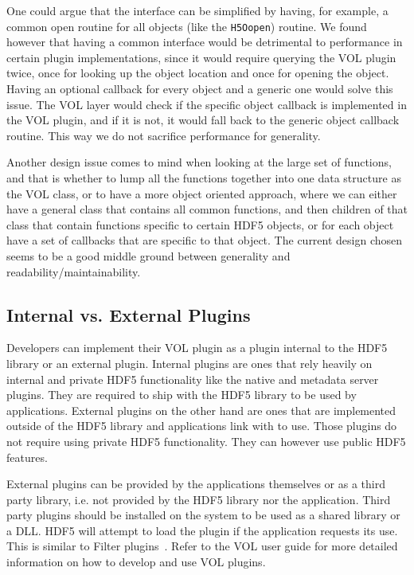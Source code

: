 \documentclass[letterpaper,hyper]{THG_RFC}
\begin{document}
One could argue that the interface can be simplified by having, for example, a common open routine for all objects (like the {\tt H5Oopen}) routine. We found however that having  a common interface would be detrimental to performance in certain plugin implementations, since it would require querying the VOL plugin twice, once for looking up the object location and once for opening the object. Having an optional callback for every object and a generic one would solve this issue. The VOL layer would check if the specific object callback is implemented in the VOL plugin, and if it is not, it would fall back to the generic object callback routine. This way we do not sacrifice performance for generality.

Another design issue comes to mind when looking at the large set of functions, and that is whether to lump all the functions together into one data structure as the VOL class, or to have a more object oriented approach, where we can either have a general class that contains all common functions, and then children of that class that contain functions specific to certain HDF5 objects, or for each object have a set of callbacks that are specific to that object. The current design chosen seems to be a good middle ground between generality and readability/maintainability.

\subsection{Internal vs. External Plugins}
Developers can implement their VOL plugin as a plugin internal to the HDF5 library or an external plugin. Internal plugins are ones that rely heavily on internal and private HDF5 functionality like the native and metadata server plugins. They are required to ship with the HDF5 library to be used by applications. External plugins on the other hand are ones that are implemented outside of the HDF5 library and applications link with to use. Those plugins do not require using private HDF5 functionality. They can however use public HDF5 features.

External plugins can be provided by the applications themselves or as a third party library, i.e. not provided by the HDF5 library nor the application. Third party plugins should be installed on the system to be used as a shared library or a DLL. HDF5 will attempt to load the plugin if the application requests its use. This is similar to Filter plugins~\cite{filters}. Refer to the VOL user guide for more detailed information on how to develop and use VOL plugins.
\end{document}

